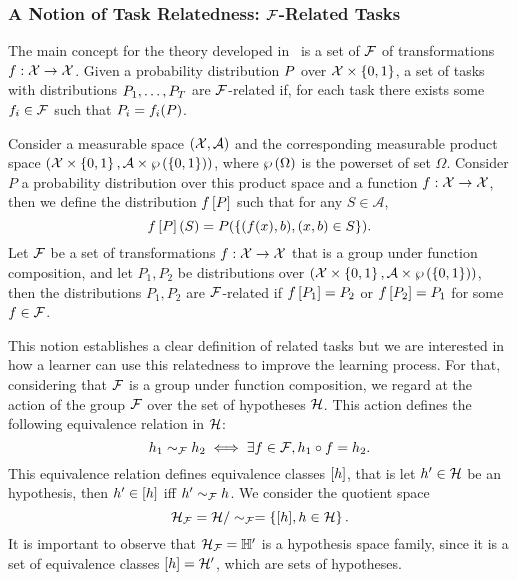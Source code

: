 \subsubsection*{A Notion of Task Relatedness: $\mathcal{F}$-Related Tasks}
The main concept for the theory developed in~\cite{Ben-DavidB08} is a set of $\mathcal{F}$ of transformations $f: \mathcal{X} \to \mathcal{X}$. Given a probability distribution $P$ over $\mathcal{X} \times \left\{0, 1\right\}$, a set of tasks with distributions $P_1, \ldots, P_T$ are $\mathcal{F}$-related if, for each task there exists some $f_i \in \mathcal{F}$ such that $P_i = f_i(P)$.

\begin{definition}\label{def:frel_tasks}
    Consider a measurable space $(\mathcal{X}, \mathcal{A})$ and the corresponding measurable product space $(\mathcal{X} \times \left\{0, 1\right\}, \mathcal{A} \times \wp\left( \left\{0, 1\right\} \right))$, where $\wp\left( \Omega \right)$ is the powerset of set $\Omega$. Consider $P$ a probability distribution over this product space and a function $f: \mathcal{X} \to \mathcal{X}$, then we define the distribution $f\left[ P \right]$ such that for any $S \in \mathcal{A}$,
    $$ f\left[ P \right](S) = P(\left\{(f(x), b), (x, b) \in S \right\}).$$
    Let $\mathcal{F}$ be a set of transformations $f: \mathcal{X} \to \mathcal{X}$ that is a group under function composition, and let $P_1, P_2$ be distributions over $(\mathcal{X} \times \left\{0, 1\right\}, \mathcal{A} \times \wp\left( \left\{0, 1\right\} \right))$, then the distributions $P_1, P_2$ are $\mathcal{F}$-related if $f\left[ P_1 \right]= P_2$ or $f\left[ P_2 \right] = P_1$ for some $f \in \mathcal{F}$.
\end{definition}
This notion establishes a clear definition of related tasks but we are interested in how a learner can use this relatedness to improve the learning process.
For that, considering that $\mathcal{F}$ is a group under function composition, we regard at the action of the group $\mathcal{F}$ over the set of hypotheses $\mathcal{H}$. This action defines the following equivalence relation in $\mathcal{H}$:
$$ h_1 \sim_{\mathcal{F}} h_2 \iff \exists f \in \mathcal{F},  h_1 \circ f = h_2 .$$
%
This equivalence relation defines equivalence classes $\lbrack h\rbrack$, that is let $h' \in \mathcal{H}$ be an hypothesis, then $h' \in \lbrack h\rbrack$ iff $h' \sim_{\mathcal{F}} h$. 
We consider the quotient space 
$$\mathcal{H}_{\mathcal{F}} = \mathcal{H} / \sim_{\mathcal{F}} = \left\{\lbrack h\rbrack, h \in \mathcal{H}\right\}.$$
It is important to observe that $\mathcal{H}_{\mathcal{F}} = \mathbb{H}'$ is a hypothesis space family, since it is a set of equivalence classes $\lbrack h\rbrack = \mathcal{H}'$, which are sets of hypotheses.
%


